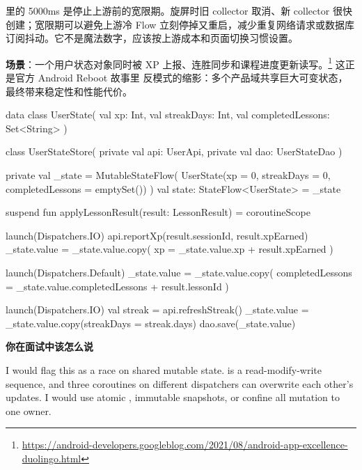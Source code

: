 \begin{followup}
 里的 5000ms 是停止上游前的宽限期。旋屏时旧 collector 取消、新 collector 很快创建；宽限期可以避免上游冷 Flow 立刻停掉又重启，减少重复网络请求或数据库订阅抖动。它不是魔法数字，应该按上游成本和页面切换习惯设置。
\end{followup}


\textbf{场景}：一个用户状态对象同时被 XP 上报、连胜同步和课程进度更新读写。\srcofficial\footnote{\url{https://android-developers.googleblog.com/2021/08/android-app-excellence-duolingo.html}} 这正是官方 Android Reboot 故事里  反模式的缩影：多个产品域共享巨大可变状态，最终带来稳定性和性能代价。

\begin{ktbug}
data class UserState(
    val xp: Int,
    val streakDays: Int,
    val completedLessons: Set<String>
)

class UserStateStore(
    private val api: UserApi,
    private val dao: UserStateDao
) {
    private val _state = MutableStateFlow(
        UserState(xp = 0, streakDays = 0, completedLessons = emptySet())
    )
    val state: StateFlow<UserState> = _state

    suspend fun applyLessonResult(result: LessonResult) = coroutineScope {
        launch(Dispatchers.IO) {
            api.reportXp(result.sessionId, result.xpEarned)
            _state.value = _state.value.copy(
                xp = _state.value.xp + result.xpEarned
            )
        }

        launch(Dispatchers.Default) {
            _state.value = _state.value.copy(
                completedLessons = _state.value.completedLessons + result.lessonId
            )
        }

        launch(Dispatchers.IO) {
            val streak = api.refreshStreak()
            _state.value = _state.value.copy(streakDays = streak.days)
            dao.save(_state.value)
        }
    }
}
\end{ktbug}

\textbf{你在面试中该怎么说}
\begin{sayit}[共享可变状态]
I would flag this as a race on shared mutable state.  is a read-modify-write sequence, and three coroutines on different dispatchers can overwrite each other's updates. I would use atomic , immutable snapshots, or confine all mutation to one owner.
\end{sayit}

